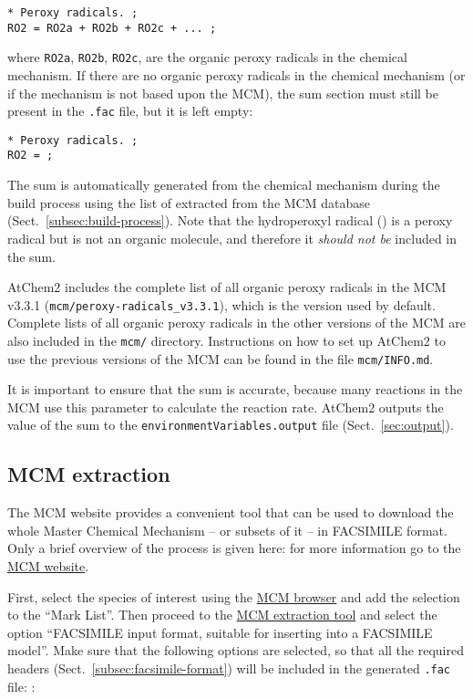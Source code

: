 \begin{verbatim}
* Peroxy radicals. ;
RO2 = RO2a + RO2b + RO2c + ... ;
\end{verbatim}

where \texttt{RO2a}, \texttt{RO2b}, \texttt{RO2c}, are the organic
peroxy radicals in the chemical mechanism. If there are no organic
peroxy radicals in the chemical mechanism (or if the mechanism is not
based upon the MCM), the  sum section must still be present in
the \texttt{.fac} file, but it is left empty:

\begin{verbatim}
* Peroxy radicals. ;
RO2 = ;
\end{verbatim}

The  sum is automatically generated from the chemical
mechanism during the build process using the list of 
extracted from the MCM database (Sect.~\ref{subsec:build-process}).
Note that the hydroperoxyl radical () is a peroxy radical but
is not an organic molecule, and therefore it \emph{should not be}
included in the  sum.

AtChem2 includes the complete list of all organic peroxy radicals in
the MCM v3.3.1 (\texttt{mcm/peroxy-radicals\_v3.3.1}), which is the
version used by default. Complete lists of all organic peroxy radicals
in the other versions of the MCM are also included in the
\texttt{mcm/} directory. Instructions on how to set up AtChem2 to use
the previous versions of the MCM can be found in the file
\texttt{mcm/INFO.md}.

It is important to ensure that the  sum is accurate, because
many reactions in the MCM use this parameter to calculate the reaction
rate. AtChem2 outputs the value of the  sum to the
\texttt{environmentVariables.output} file (Sect.~\ref{sec:output}).

\subsection{MCM extraction} \label{subsec:mcm-extraction}

The MCM website provides a convenient tool that can be used to
download the whole Master Chemical Mechanism -- or subsets of it -- in
FACSIMILE format. Only a brief overview of the process is given here:
for more information go to the \href{http://mcm.leeds.ac.uk/}{MCM website}.

First, select the species of interest using the
\href{http://mcm.leeds.ac.uk/MCM/roots.htt}{MCM browser} and add the
selection to the ``Mark List''. Then proceed to the
\href{http://mcm.leeds.ac.uk/MCM/extract.htt}{MCM extraction tool} and
select the option ``FACSIMILE input format, suitable for inserting
into a FACSIMILE model''. Make sure that the following options are
selected, so that all the required headers (Sect.~\ref{subsec:facsimile-format})
will be included in the generated \texttt{.fac} file: :

